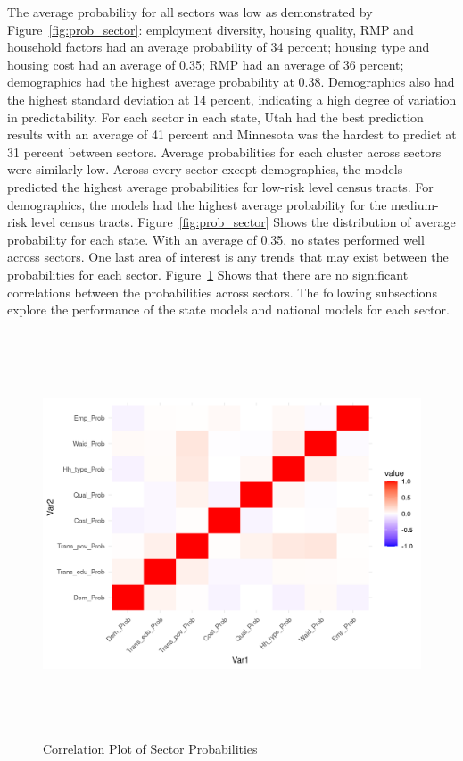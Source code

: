 The average probability for all sectors was low as demonstrated by Figure~\ref{fig:prob_sector}: employment diversity, housing quality, RMP and household factors had an average probability of 34 percent; housing type and housing cost had an average of 0.35; RMP had an average of 36 percent; demographics had the highest average probability at 0.38. Demographics also had the highest standard deviation at 14 percent, indicating a high degree of variation in predictability. For each sector in each state, Utah had the best prediction results with an average of 41 percent and Minnesota was the hardest to predict at 31 percent between sectors. Average probabilities for each cluster across sectors were similarly low. Across every sector except demographics, the models predicted the highest average probabilities for low-risk level census tracts. For demographics, the models had the highest average probability for the medium-risk level census tracts. Figure~\ref{fig:prob_sector} Shows the distribution of average probability for each state. With an average of 0.35, no states performed well across sectors. One last area of interest is any trends that may exist between the probabilities for each sector. Figure~\ref{fig:prob_corr} Shows that there are no significant correlations between the probabilities across sectors. The following subsections explore the performance of the state models and national models for each sector. 

\begin{figure}[htbp]
    \centering
     \includegraphics[width=1\textwidth, height=12cm]{plots/prob_corr.png}
     \caption{Correlation Plot of Sector Probabilities}
     \label{fig:prob_corr}
 \end{figure}


